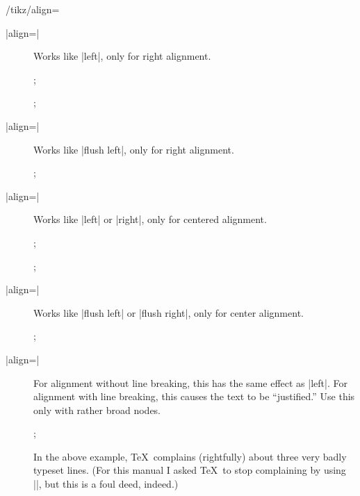 \begin{key}{/tikz/align=}
\begin{description}
  \item[|align=|]
    Works like |left|, only for right alignment.
\begin{codeexample}[]
\tikz {};
\end{codeexample}
\begin{codeexample}[]
\tikz {};
\end{codeexample}

  \item[|align=|]
    Works like |flush left|, only for right alignment.
\begin{codeexample}[]
\tikz {};
\end{codeexample}

  \item[|align=|]
    Works like |left| or |right|, only for centered alignment.
\begin{codeexample}[]
\tikz {};
\end{codeexample}
\begin{codeexample}[]
\tikz {};
\end{codeexample}

  \item[|align=|]
    Works like |flush left| or |flush right|, only for center alignment.
\begin{codeexample}[]
\tikz {};
\end{codeexample}

  \item[|align=|]
    For alignment without line breaking, this has the same effect as
    |left|. For alignment with line breaking, this causes the text to
    be ``justified.'' Use this only with rather broad nodes.
{%
\begin{codeexample}[]
\tikz {};
\end{codeexample}
}
  In the above example, \TeX\ complains (rightfully) about three very
  badly typeset lines. (For this manual I asked \TeX\ to stop
  complaining by using ||, but this is a foul deed,
  indeed.)


\end{description}
\end{key}
